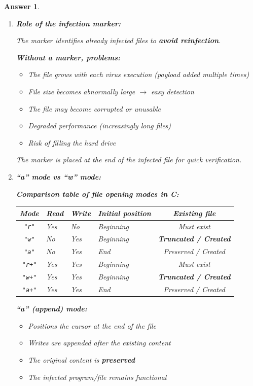 \documentclass[a4paper,11pt]{article}
\theoremstyle{plain}
\newtheorem{correction}{Answer}
\theoremstyle{definition}
\begin{document}
\begin{correction}

\begin{enumerate}
\item \textbf{Role of the infection marker:}

The marker identifies already infected files to \textbf{avoid reinfection}.

\textbf{Without a marker, problems:}
\begin{itemize}
\item The file grows with each virus execution (payload added multiple times)
\item File size becomes abnormally large $\rightarrow$ easy detection
\item The file may become corrupted or unusable
\item Degraded performance (increasingly long files)
\item Risk of filling the hard drive
\end{itemize}

The marker is placed at the end of the infected file for quick verification.

\item \textbf{``a'' mode vs ``w'' mode:}

\textbf{Comparison table of file opening modes in C:}

\medskip
\begin{center}
\begin{tabular}{c|p{2.5cm}|p{2.5cm}|p{2.5cm}|c}
\toprule
\textbf{Mode} & \textbf{Read} & \textbf{Write} & \textbf{Initial position} & \textbf{Existing file} \\
\midrule
\texttt{"r"}  & Yes & No  & Beginning & Must exist \\
\texttt{"w"}  & No  & Yes & Beginning & \textbf{Truncated / Created} \\
\texttt{"a"}  & No  & Yes & End       & Preserved / Created \\
\texttt{"r+"} & Yes & Yes & Beginning & Must exist \\
\texttt{"w+"} & Yes & Yes & Beginning & \textbf{Truncated / Created} \\
\texttt{"a+"} & Yes & Yes & End       & Preserved / Created \\
\bottomrule
\end{tabular}
\end{center}

\medskip
\textbf{``a'' (append) mode:}
\begin{itemize}
\item Positions the cursor at the end of the file
\item Writes are appended after the existing content
\item The original content is \textbf{preserved}
\item The infected program/file remains functional
\end{itemize}


\end{enumerate}
\end{correction}
\end{document}
